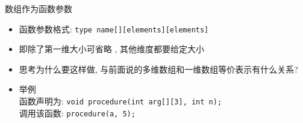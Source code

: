 \begin{frame}[fragile]{数组作为函数参数}
    \begin{itemize}[<+- | alert@+>]
        \item 函数参数格式: \texttt{type name[][elements][elements]}
        \item 即除了第一维大小可省略 , 其他维度都要给定大小
        \item 思考为什么要这样做, 与前面说的多维数组和一维数组等价表示有什么关系?
        \item 举例 \\
        函数声明为: \texttt{void procedure(int arg[][3], int n);}\\
        调用该函数: \texttt{procedure(a, 5);}
    \end{itemize}
\end{frame}